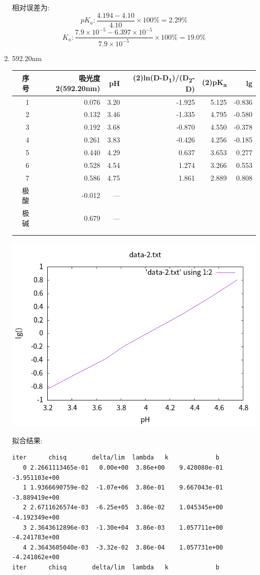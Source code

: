 \documentclass[11pt]{report}
\begin{document}
\begin{enumerate}
相对误差为:
\[
pK_{a}: \frac{4.194-4.10}{4.10}\times 100\% =2.29\%
\]
\[
K_{a}: \frac{7.9\times 10^{-5}-6.397\times 10^{-5}}{7.9\times 10^{-5}}\times 100\%=19.0\%
\]
\item 592.20nm
\label{sec:org9fb717c}
\begin{center}
\begin{tabular}{rrrrrr}
序号 & 吸光度2(592.20nm) & pH & (2)ln(D-D\textsubscript{1})/(D\textsubscript{2}-D) & (2)pK\textsubscript{a} & lg\\
\hline
1 & 0.076 & 3.20 & -1.925 & 5.125 & -0.836\\
2 & 0.132 & 3.46 & -1.335 & 4.795 & -0.580\\
3 & 0.192 & 3.68 & -0.870 & 4.550 & -0.378\\
4 & 0.261 & 3.83 & -0.426 & 4.256 & -0.185\\
5 & 0.440 & 4.29 & 0.637 & 3.653 & 0.277\\
6 & 0.528 & 4.54 & 1.274 & 3.266 & 0.553\\
7 & 0.586 & 4.75 & 1.861 & 2.889 & 0.808\\
极酸 & -0.012 & --- &  &  & \\
极碱 & 0.679 & --- &  &  & \\
 &  &  &  &  & \\
 &  &  &  &  & \\
\end{tabular}
\end{center}
\begin{center}
\includegraphics[width=.9\linewidth]{../img/data-2.txt.png}
\end{center}
拟合结果:
\begin{verbatim}
iter      chisq       delta/lim  lambda   k             b            
   0 2.2661113465e-01   0.00e+00  3.86e+00    9.420080e-01  -3.951103e+00
   1 1.9366690759e-02  -1.07e+06  3.86e-01    9.667043e-01  -3.889419e+00
   2 2.6711626574e-03  -6.25e+05  3.86e-02    1.045345e+00  -4.192349e+00
   3 2.3643612896e-03  -1.30e+04  3.86e-03    1.057711e+00  -4.241783e+00
   4 2.3643605040e-03  -3.32e-02  3.86e-04    1.057731e+00  -4.241862e+00
iter      chisq       delta/lim  lambda   k             b            


\end{verbatim}
\end{enumerate}
\end{document}
